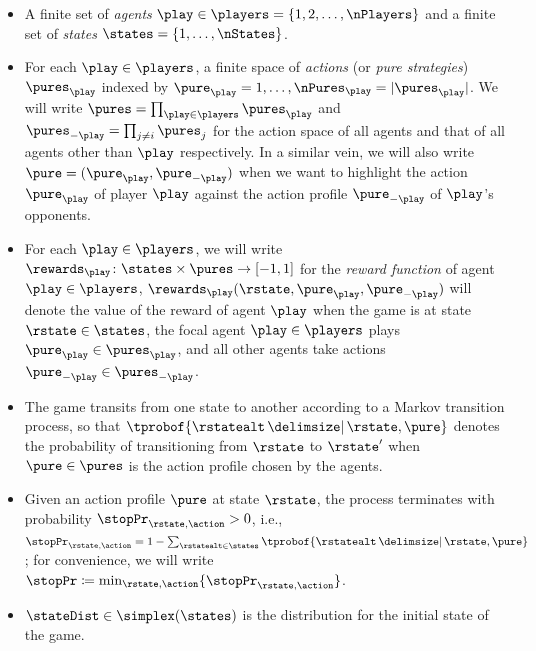 \begin{itemize}
\item
A finite set of \emph{agents} $\play \in \players = \{1,2,\dots, \nPlayers\}$ and a finite set of \emph{states} $\states = \{1,\dotsc,\nStates\}$.
\item
For each $\play\in\players$, a finite space of \emph{actions} (or \emph{pure strategies}) $\pures_{\play}$ indexed by $\pure_{\play} = 1,\dotsc,\nPures_{\play} = \abs{\pures_{\play}}$.
We will write $\pures = \prod_{\play \in \players} \pures_{\play}$ and $\pures_{-\play} = \prod_{j\neq i} \pures_{j}$ for the action space of all agents and that of all agents other than $\play$ respectively.
In a similar vein, we will also write $\pure = (\pure_{\play},\pure_{-\play})$ when we want to highlight the action $\pure_{\play}$ of player $\play$ against the action profile $\pure_{-\play}$ of $\play$'s opponents.
\item
For each $\play\in\players$, we will write $\rewards_{\play} \from \states\times \pures \to [-1,1]$ for the \emph{%
reward function} of agent $\play \in \players$, \ie $\rewards_{\play}(\rstate,\pure_{\play},\pure_{-\play})$ will denote the value of the %
reward of agent $\play$ when the game is at state $\rstate\in\states$, the focal agent $\play\in\players$ plays $\pure_{\play}\in\pures_{\play}$, and all other agents take actions $\pure_{-\play} \in \pures_{-\play}$.
\item
The game transits from one state to another according to a Markov transition process, so that $\tprobof{\rstatealt \given \rstate, \pure}$ denotes the probability of transitioning from $\rstate$ to $\rstate'$ when $\pure \in \pures$ is the action profile chosen by the agents.
\item
Given an action profile $\pure$ at state $\rstate$, the process terminates with probability $\stopPr_{\rstate,\action} > 0$, i.e., $\stopPr_{\rstate,\action} = 1 - \sum_{\rstatealt \in \states}\tprobof{\rstatealt \given \rstate, \pure}$; for convenience, we will write $\stopPr \defeq \min_{\rstate,\action}\braces{\stopPr_{\rstate,\action}}$.
\item
$\stateDist\in \simplex(\states)$ is the distribution for the initial state of the game.
\end{itemize}

